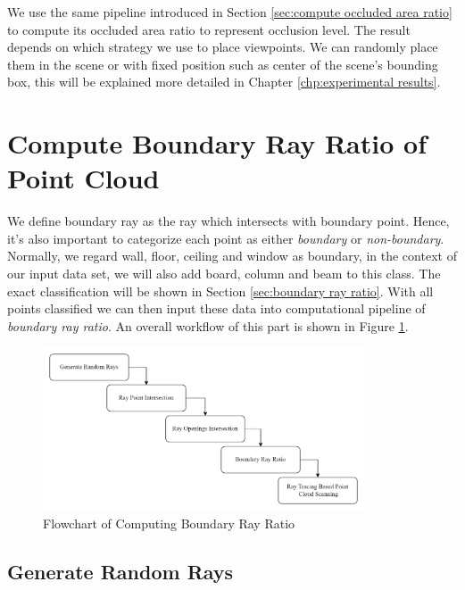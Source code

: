\documentclass[11pt, a4paper,oneside,chapterprefix=false]{scrbook}
\begin{document}
We use the same pipeline introduced in Section \ref{sec:compute occluded area ratio} to compute its occluded area ratio to represent occlusion level. The result depends on which strategy we use to place viewpoints. We can randomly place them in the scene or with fixed position such as center of the scene's bounding box, this will be explained more detailed in Chapter \ref{chp:experimental results}.

\section{Compute Boundary Ray Ratio of Point Cloud} \label{compute boundary ray ratio of point cloud} 

We define boundary ray as the ray which intersects with boundary point. Hence, it's also important to categorize each point as either \emph{boundary} or \emph{non-boundary}. Normally, we regard wall, floor, ceiling and window as boundary, in the context of our input data set, we will also add board, column and beam to this class. The exact classification will be shown in Section \ref{sec:boundary ray ratio}. With all points classified we can then input these data into computational pipeline of \emph{boundary ray ratio}. An overall workflow of this part is shown in Figure \ref{fig:flowchart of computing boundary ray ratio}.

\begin{figure}[H]
    \centering
    \includegraphics*[width=0.85\textwidth]{figures/Compute Boundary Ray Ratio of Point Cloud.png}
    \caption{Flowchart of Computing Boundary Ray Ratio}
    \label{fig:flowchart of computing boundary ray ratio}
\end{figure}


\subsection{Generate Random Rays}
\end{document}
